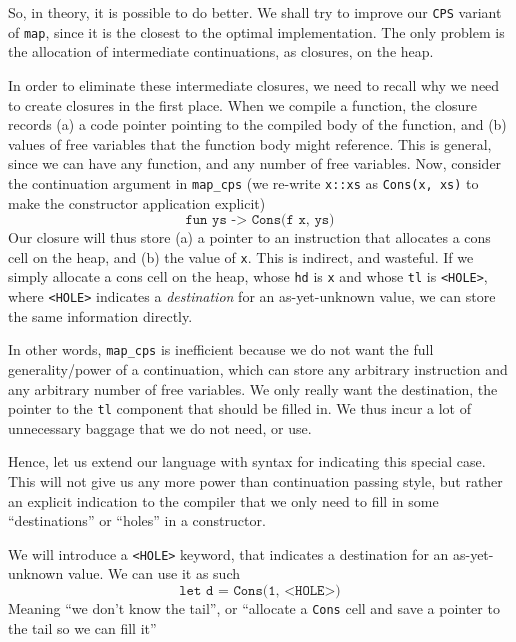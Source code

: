 So, in theory, it is possible to do better. We shall try to improve our \texttt{CPS} variant of \texttt{map}, since it is the closest to the optimal implementation. The only problem is the allocation of intermediate continuations, as closures, on the heap. 

In order to eliminate these intermediate closures, we need to recall why we need to create closures in the first place. When we compile a function, the closure records (a) a code pointer pointing to the compiled body of the function, and (b) values of free variables that the function body might reference. This is general, since we can have any function, and any number of free variables. Now, consider the continuation argument in \texttt{map\_cps} (we re-write \texttt{x::xs} as \texttt{Cons(x, xs)} to make the constructor application explicit)
\[\texttt{fun ys -> Cons(f x, ys)}\]
Our closure will thus store (a) a pointer to an instruction that allocates a cons cell on the heap, and (b) the value of \texttt{x}. This is indirect, and wasteful. If we simply allocate a cons cell on the heap, whose \texttt{hd} is \texttt{x} and whose \texttt{tl} is \texttt{<HOLE>}, where \texttt{<HOLE>} indicates a \textit{destination} for an as-yet-unknown value, we can store the same information directly. 

In other words, \texttt{map\_cps} is inefficient because we do not want the full generality/power of a continuation, which can store any arbitrary instruction and any arbitrary number of free variables. We only really want the destination, the pointer to the \texttt{tl} component that should be filled in. We thus incur a lot of unnecessary baggage that we do not need, or use.

Hence, let us extend our language with syntax for indicating this special case. This will not give us any more power than continuation passing style, but rather an explicit indication to the compiler that we only need to fill in some ``destinations'' or ``holes'' in a constructor. 

We will introduce a \texttt{<HOLE>} keyword, that indicates a destination for an as-yet-unknown value. We can use it as such
\[\texttt{let d = Cons(1, <HOLE>)}\]
Meaning ``we don't know the tail'', or ``allocate a \texttt{Cons} cell and save a pointer to the tail so we can fill it''


